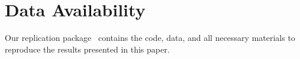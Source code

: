 
\section*{Data Availability}
\label{sec:data_availability}
Our replication package~\cite{replication_package} contains the code, data, and all necessary materials to reproduce the results presented in this paper.
